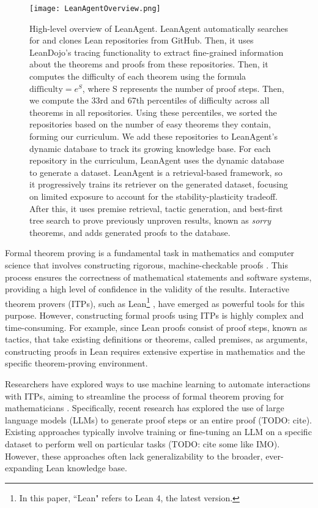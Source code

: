 \documentclass{article} %
\begin{document}
\begin{figure}[!ht]
    \centering
    \texttt{[image: LeanAgentOverview.png]}
    \caption{High-level overview of LeanAgent. LeanAgent automatically searches for and clones Lean repositories from GitHub. Then, it uses LeanDojo's \citep{yangLeanDojoTheoremProving2023} tracing functionality to extract fine-grained information about the theorems and proofs from these repositories. Then, it computes the difficulty of each theorem using the formula $\text{difficulty} = e^{S}$, where S represents the number of proof steps. Then, we compute the 33rd and 67th percentiles of difficulty across all theorems in all repositories. Using these percentiles, we sorted the repositories based on the number of easy theorems they contain, forming our curriculum. We add these repositories to LeanAgent's dynamic database to track its growing knowledge base. For each repository in the curriculum, LeanAgent uses the dynamic database to generate a dataset. LeanAgent is a retrieval-based framework, so it progressively trains its retriever on the generated dataset, focusing on limited exposure to account for the stability-plasticity tradeoff. After this, it uses premise retrieval, tactic generation, and best-first tree search to prove previously unproven results, known as \textit{sorry} theorems, and adds generated proofs to the database.
    \label{fig:overview}}
\end{figure}

Formal theorem proving is a fundamental task in mathematics and computer science that involves constructing rigorous, machine-checkable proofs \citep{imperialcollegefacultyofnaturalsciencesFutureMathematicsProfessor2019}. This process ensures the correctness of mathematical statements and software systems, providing a high level of confidence in the validity of the results. Interactive theorem provers (ITPs), such as Lean\footnote{In this paper, ``Lean" refers to Lean 4, the latest version.} \citep{demouraLeanTheoremProver2015}, have emerged as powerful tools for this purpose. However, constructing formal proofs using ITPs is highly complex and time-consuming. For example, since Lean proofs consist of proof steps, known as tactics, that take existing definitions or theorems, called premises, as arguments, constructing proofs in Lean requires extensive expertise in mathematics and the specific theorem-proving environment.

Researchers have explored ways to use machine learning to automate interactions with ITPs, aiming to streamline the process of formal theorem proving for mathematicians \citep{yangLearningProveTheorems2019}. Specifically, recent research has explored the use of large language models (LLMs) to generate proof steps or an entire proof (TODO: cite). Existing approaches typically involve training or fine-tuning an LLM on a specific dataset to perform well on particular tasks (TODO: cite some like IMO). However, these approaches often lack generalizability to the broader, ever-expanding Lean knowledge base.
\end{document}
